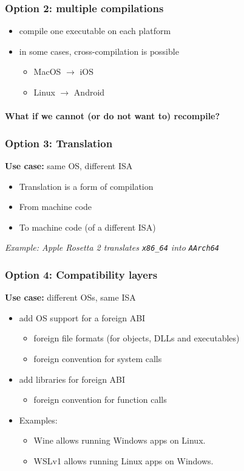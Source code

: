 \documentclass[12pt]{article}
\begin{document}
\subsubsection{Option 2: multiple compilations}
\begin{itemize}
  \item compile one executable on each platform
  \item in some cases, cross-compilation is possible
  \begin{itemize}
    \item MacOS $\rightarrow$ iOS
    \item Linux $\rightarrow$ Android
  \end{itemize}
\end{itemize}

\paragraph{What if we cannot (or do not want to) recompile?}


\subsubsection{Option 3: Translation}
\textbf{Use case:} same OS, different ISA
\begin{itemize}
    \item Translation is a form of compilation
    \item From machine code
    \item To machine code (of a different ISA)
\end{itemize}
\textit{Example: Apple Rosetta 2 translates \texttt{x86\_64} into \texttt{AArch64}}

\subsubsection{Option 4: Compatibility layers}
\textbf{Use case:} different OSs, same ISA
\begin{itemize}
    \item add OS support for a foreign ABI
    \begin{itemize}
        \item foreign file formats (for objects, DLLs and executables)
        \item foreign convention for system calls
    \end{itemize}
    \item add libraries for foreign ABI
    \begin{itemize}
        \item foreign convention for function calls
    \end{itemize}
    \item Examples:
    \begin{itemize}
        \item Wine allows running Windows apps on Linux.
        \item WSLv1 allows running Linux apps on Windows.
    \end{itemize}
\end{itemize}
\end{document}
